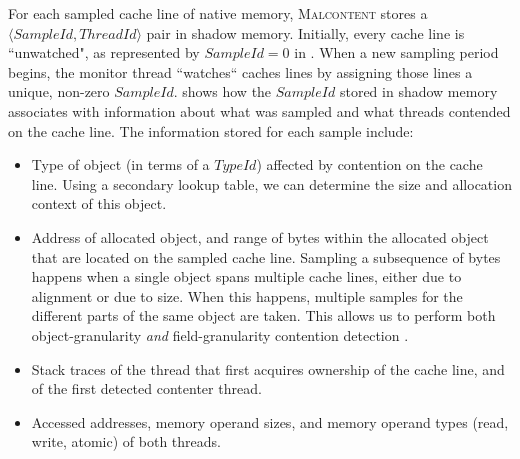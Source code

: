 \documentclass[letterpaper,twocolumn,10pt]{article}
\newcommand{\TextToolname}{Malcontent}
\newcommand{\Toolname}{\textsc{\TextToolname{}}}
\begin{document}
For each sampled cache line of native memory, \Toolname{} stores a $\langle SampleId,ThreadId \rangle$ pair in shadow memory.
Initially, every cache line is ``unwatched", as represented by $SampleId=0$ in . When a new sampling period
begins, the monitor thread ``watches`` caches lines by assigning those lines a unique, non-zero $SampleId$. 
shows how the $SampleId$ stored in shadow memory associates with information about what was sampled and what threads contended on
the cache line. The information stored for each sample include: \begin{itemize}

	\item Type of object (in terms of a $TypeId$) affected by contention on the cache line. Using a secondary lookup table, we can
determine the size and allocation context of this object.

	\item Address of allocated object, and range of bytes within the allocated object that are located on the sampled cache
line. Sampling a subsequence of bytes happens when a single object spans multiple cache lines, either due to alignment or due to size. When
this happens, multiple samples for the different parts of the same object are taken. This allows us to perform both object-granularity
\emph{and} field-granularity contention detection \cite{RaceTrack}.

	\item Stack traces of the thread that first acquires ownership of the cache line, and of the first detected contenter thread.

	\item Accessed addresses, memory operand sizes, and memory operand types (read, write, atomic) of both threads.
\end{itemize}
\end{document}
